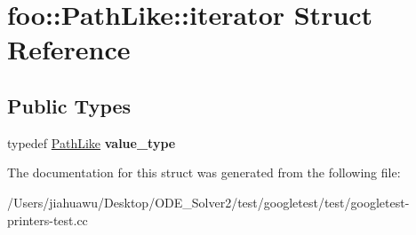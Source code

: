 \hypertarget{structfoo_1_1_path_like_1_1iterator}{}\section{foo\+:\+:Path\+Like\+:\+:iterator Struct Reference}
\label{structfoo_1_1_path_like_1_1iterator}
\subsection*{Public Types}
\begin{DoxyCompactItemize}
\item 
\mbox{\label{structfoo_1_1_path_like_1_1iterator_a797c204878a09e04b23cfe6b48ac7016}} 
typedef \mbox{\hyperlink{classfoo_1_1_path_like}{Path\+Like}} {\bfseries value\+\_\+type}
\end{DoxyCompactItemize}


The documentation for this struct was generated from the following file\+:\begin{DoxyCompactItemize}
\item 
/\+Users/jiahuawu/\+Desktop/\+O\+D\+E\+\_\+\+Solver2/test/googletest/test/googletest-\/printers-\/test.\+cc\end{DoxyCompactItemize}

